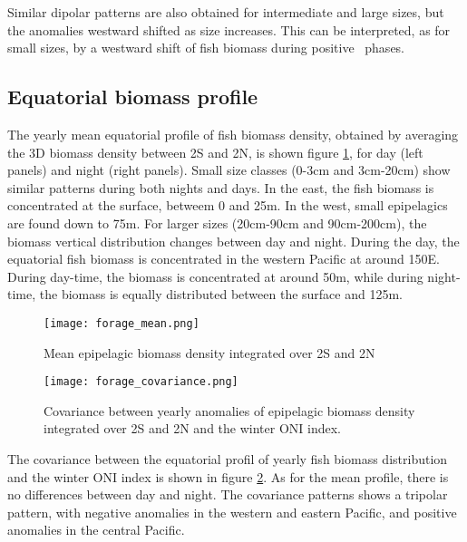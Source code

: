 Similar dipolar patterns are also obtained for intermediate and large sizes, but the anomalies westward shifted as size increases. This can be interpreted, as for small sizes, by a westward shift of fish biomass during positive \nino\ phases.\\

\subsection{Equatorial biomass profile}

The yearly mean equatorial profile of fish biomass density, obtained by averaging the 3D biomass density between 2\degree S and 2\degree N, 
is shown figure \ref{fig:mean-forage}, for day (left panels) and night (right panels). Small size classes (0-3cm and 3cm-20cm) show similar 
patterns during both nights and days. In the east, the fish biomass is concentrated at the surface, betweem 0 and 25m. In the west, small epipelagics
are found down to 75m. For larger sizes (20cm-90cm and 90cm-200cm), the biomass vertical distribution changes between day and night. During the day, the equatorial fish biomass is concentrated in the western Pacific at around 150\degree E. During day-time, the biomass is concentrated at around 50m, while during night-time, the biomass is equally distributed between the surface and 125m.\\

\begin{figure}[h!]
    \centering	
    \texttt{[image: forage\_mean.png]}
	\caption{Mean epipelagic biomass density integrated over 2\degree S and 2\degree N}
    \label{fig:mean-forage}
\end{figure}

\begin{figure}[h!]
    \centering
    \texttt{[image: forage\_covariance.png]}
	\caption{Covariance between yearly anomalies of epipelagic biomass density integrated over 2\degree S and 2\degree N and the winter ONI index.}
    \label{fig:covariance-forage}
\end{figure}

The covariance between the equatorial profil of yearly fish biomass distribution and the winter ONI index is shown in figure \ref{fig:covariance-forage}. As for the mean profile, there is no differences between day and night. The covariance patterns shows a tripolar pattern, with negative anomalies in the western and eastern Pacific, and positive anomalies in the central Pacific.\\

